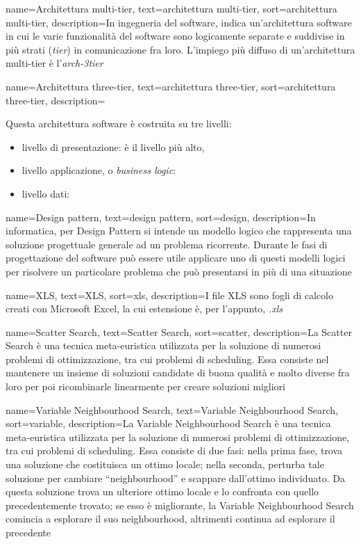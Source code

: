 {
    name=Architettura multi-tier,
    text=architettura multi-tier,
    sort=architettura multi-tier,
    description={In ingegneria del software, indica un'architettura software in cui le varie funzionalità del software sono logicamente separate e suddivise in più strati (\textit{tier}) in comunicazione fra loro. L'impiego più diffuso di un'architettura multi-tier è l'\emph{\gls{arch-3tier}}\glsfirstoccur   
}}

{
    name=Architettura three-tier,
    text=architettura three-tier,
    sort=architettura three-tier,
    description={Questa architettura software è costruita su tre livelli:
        \begin{itemize}
            \item livello di presentazione: è il livello più alto, 
            \item livello applicazione, o \textit{business logic}:
            \item livello dati:
        \end{itemize}
}}

{
    name=Design pattern,
    text=design pattern,
    sort=design,
    description={In informatica, per Design Pattern si intende un modello logico che rappresenta una soluzione progettuale generale ad un problema ricorrente. Durante le fasi di progettazione del software può essere utile applicare uno di questi modelli logici per risolvere un particolare problema che può presentarsi in più di una situazione
}}

{
    name=XLS,
    text=XLS,
    sort=xls,
    description={I file XLS sono fogli di calcolo creati con Microsoft Excel, la cui estensione è, per l'appunto, \textit{.xls}
}}

{
    name=Scatter Search,
    text=Scatter Search,
    sort=scatter,
    description={La Scatter Search è una tecnica meta-euristica utilizzata per la soluzione di numerosi problemi di ottimizzazione, tra cui problemi di scheduling. Essa consiste nel mantenere un insieme di soluzioni candidate di buona qualità e molto diverse fra loro per poi ricombinarle linearmente per creare soluzioni migliori
}}

{
    name=Variable Neighbourhood Search,
    text=Variable Neighbourhood Search,
    sort=variable,
    description={La Variable Neighbourhood Search è una tecnica meta-euristica utilizzata per la soluzione di numerosi problemi di ottimizzazione, tra cui problemi di scheduling. Essa consiste di due fasi: nella prima fase, trova una soluzione che costituisca un ottimo locale; nella seconda, perturba tale soluzione per cambiare ``neighbourhood'' e scappare dall'ottimo individuato. Da questa soluzione trova un ulteriore ottimo locale e lo confronta con quello precedentemente trovato; se esso è migliorante, la Variable Neighbourhood Search comincia a esplorare il suo neighbourhood, altrimenti continua ad esplorare il precedente 
}}


